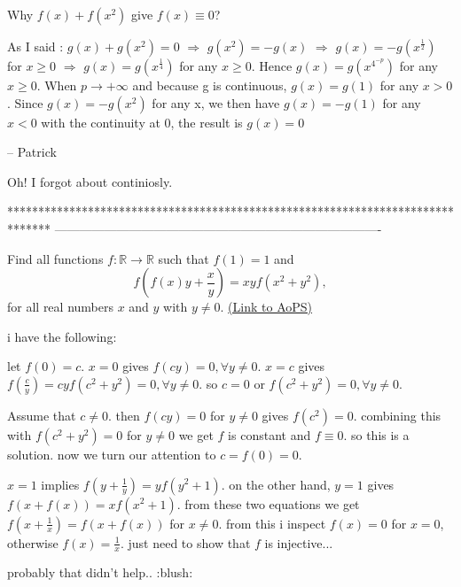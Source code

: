 \begin{mysolution}
	\begin{tcolorbox}Why $f(x)+f(x^{2})$ give $f(x)\equiv 0$?\end{tcolorbox}

As I said : $g(x)+g(x^{2})=0$ $\Rightarrow $ $g(x^{2})=-g(x)$ $\Rightarrow $ $g(x)=-g(x^{\frac{1}{2}})$ for $x\geq 0$ $\Rightarrow $ $g(x)=g(x^{\frac{1}{4}})$ for any $x\geq 0$.
Hence $g(x)=g(x^{4^{-p}})$ for any $x\geq 0$.
When $p\rightarrow+\infty$ and because g is continuous, $g(x)=g(1)$ for any $x>0$.
Since $g(x)=-g(x^{2})$ for any x, we then have $g(x)=-g(1)$ for any $x<0$
with the continuity at 0, the result is $g(x)=0$

-- 
Patrick
\end{mysolution}



\begin{mysolution}
	Oh! I forgot about continiosly.
\end{mysolution}
*******************************************************************************
-------------------------------------------------------------------------------

\begin{problem}
	Find all functions $f : \mathbb{R}\to\mathbb{R}$ such that $f(1) = 1$ and
\[f\left(f(x)y+\frac{x}{y}\right)=xyf(x^{2}+y^{2}), \]
for all real numbers $x$ and $y$ with $y\not = 0$.
	\flushright \href{https://artofproblemsolving.com/community/c6h148711}{(Link to AoPS)}
\end{problem}




\begin{mysolution}
	i have the following:

let $f(0)=c$. $x=0$ gives $f(cy)=0,\forall y\neq 0$. $x=c$ gives $f(\frac{c}{y})=cyf(c^{2}+y^{2})=0, \forall y\neq 0$.
so $c=0$ or $f(c^{2}+y^{2})=0, \forall y\neq 0$. 

Assume that $c\neq 0$. then $f(cy)=0$ for $y\neq 0$ gives $f(c^{2})=0$. combining this with $f(c^{2}+y^{2})=0$ for $y\neq 0$ we get $f$ is constant and $f\equiv 0$. so this is a solution. now we turn our attention to $c=f(0)=0$.

$x=1$ implies $f(y+\frac{1}{y})=yf(y^{2}+1)$. on the other hand, $y=1$ gives $f(x+f(x))=xf(x^{2}+1)$. from these two equations we get $f(x+\frac{1}{x})=f(x+f(x))$ for $x\neq 0$. from this i inspect $f(x)=0$ for $x=0$, otherwise $f(x)=\frac{1}{x}$. just need to show that $f$ is injective...

probably that didn't help.. :blush:
\end{mysolution}



